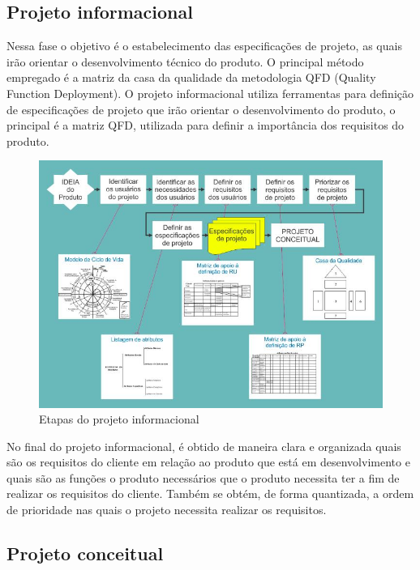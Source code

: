 \subsection{Projeto informacional}

Nessa fase o objetivo é o estabelecimento das especificações de projeto, as quais irão orientar o desenvolvimento técnico do produto. O principal método empregado é a matriz
da casa da qualidade da metodologia QFD (Quality Function Deployment). O projeto informacional utiliza ferramentas para definição de especificações de projeto que irão
orientar o desenvolvimento do produto, o principal é a matriz QFD, utilizada para definir a importância dos requisitos do produto.  \autocite{PRODIP}

\begin{figure}[htb]
	\caption{\label{fig:1180}Etapas do projeto informacional}
	\begin{center}
		\includegraphics[width=\textwidth]{pictures/1180.jpg}
	\end{center}
\end{figure}

No final do projeto informacional, é obtido de maneira clara e organizada quais são os requisitos do cliente em relação ao produto que está em desenvolvimento e quais são as
funções o produto necessários que o produto necessita ter a fim de realizar os requisitos do cliente. Também se obtém, de forma quantizada, a ordem de prioridade nas quais
o projeto necessita realizar os requisitos.

\subsection{Projeto conceitual}

